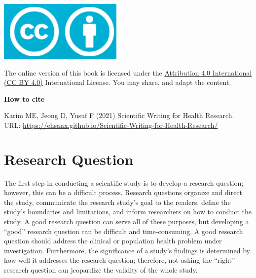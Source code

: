 \documentclass[
]{book}
\begin{document}
\includegraphics[width=0.25\linewidth]{images/by}

The online version of this book is licensed under the \href{https://creativecommons.org/licenses/by/4.0/}{Attribution 4.0 International (CC BY 4.0)} International License. You may share, and adapt the content.

\begin{rmdcomment}
\textbf{How to cite}

Karim ME, Jeong D, Yusuf F (2021) Scientific Writing for Health
Research. URL:
\url{https://ehsanx.github.io/Scientific-Writing-for-Health-Research/}
\end{rmdcomment}

\hypertarget{research-question}{%
\chapter{Research Question}\label{research-question}}

The first step in conducting a scientific study is to develop a research question; however, this can be a difficult process. Research questions organize and direct the study, communicate the research study's goal to the readers, define the study's boundaries and limitations, and inform researchers on how to conduct the study. A good research question can serve all of these purposes, but developing a ``good'' research question can be difficult and time-consuming. A good research question should address the clinical or population health problem under investigation. Furthermore, the significance of a study's findings is determined by how well it addresses the research question; therefore, not asking the ``right'' research question can jeopardize the validity of the whole study.
\end{document}
